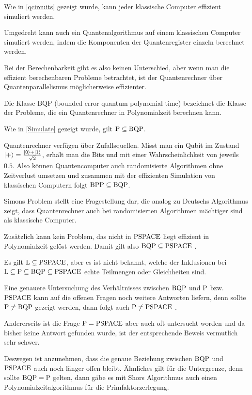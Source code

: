 \documentclass{acm_proc_article-sp}
\begin{document}
Wie in \autoref{qcircuits} gezeigt wurde, kann jeder klassische Computer effizient simuliert werden.

Umgedreht kann auch ein Quantenalgorithmus auf einem klassischen Computer simuliert werden, indem
die Komponenten der Quantenregister einzeln berechnet werden. 

Bei der Berechenbarkeit gibt es also keinen Unterschied, aber wenn man die effizient berechenbaren Probleme betrachtet,
ist der Quantenrechner über Quantenparallelismus möglicherweise effizienter.

Die Klasse BQP (bounded error quantum polynomial time) bezeichnet die Klasse der Probleme, die ein Quantenrechner in 
Polynomialzeit berechnen kann.

Wie in \autoref{Simulate} gezeigt wurde, gilt $\operatorname{P} \subseteq \operatorname{BQP}$.

Quantenrechner verfügen über Zufallsquellen. Misst man ein Qubit im Zustand $\left|+\right\rangle = \frac{\left|0\right\rangle + \left|1\right\rangle}{\sqrt 2}$,
erhält man die Bits  und  mit einer Wahrscheinlichkeit von jeweils $0.5$.
Also können Quantencomputer auch randomisierte Algorithmen ohne Zeitverlust 
umsetzen und zusammen mit der effizienten Simulation von klassischen Computern folgt $\operatorname{BPP} \subseteq \operatorname{BQP}$. 

Simons Problem stellt eine Fragestellung dar, die analog zu Deutschs Algorithmus zeigt, dass
Quantenrechner auch bei randomisierten Algorithmen mächtiger sind als klassische Computer.

Zusätzlich kann kein Problem, das nicht in $\operatorname{PSPACE}$ liegt effizient in Polynomialzeit gelöst werden.
Damit gilt also $\operatorname{BQP} \subseteq \operatorname{PSPACE}$ \cite{Barenco}.


Es gilt $\operatorname{L} \subsetneq \operatorname{PSPACE}$, aber es ist nicht bekannt, welche der Inklusionen bei 
$\operatorname{L} \subseteq \operatorname{P} \subseteq \operatorname{BQP} \subseteq \operatorname{PSPACE}$ echte Teilmengen oder Gleichheiten sind.

Eine genauere Untersuchung des Verhältnisses zwischen $\operatorname{BQP}$ und $\operatorname{P}$ bzw. $\operatorname{PSPACE}$ kann auf die offenen
Fragen noch weitere Antworten liefern, denn 
sollte $\operatorname{P} \neq \operatorname{BQP}$ gezeigt werden, dann folgt auch $ \operatorname{P} \neq \operatorname{PSPACE}$ \cite{Barenco}.

Andererseits ist die Frage $\operatorname{P} = \operatorname{PSPACE}$ aber auch oft untersucht worden und da bisher keine Antwort gefunden wurde,
ist der entsprechende Beweis vermutlich sehr schwer.

Deswegen ist anzunehmen, dass die genaue Beziehung zwischen $\operatorname{BQP}$ und $\operatorname{PSPACE}$ auch noch länger offen bleibt.
Ähnliches gilt für die Untergrenze, denn sollte $\operatorname{BQP} = \operatorname{P}$ gelten, dann gäbe es mit Shors Algorithmus auch einen 
Polynomialzeitalgorithmus für die Primfaktorzerlegung.
\end{document}
